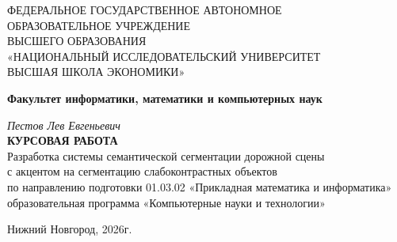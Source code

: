 \documentclass[14pt,a4paper]{extarticle}
\begin{document}
\onehalfspacing
\pagestyle{plain}
\sloppy
\begin{titlepage}
\thispagestyle{empty}
\begin{center}
\normalsize
ФЕДЕРАЛЬНОЕ ГОСУДАРСТВЕННОЕ АВТОНОМНОЕ\\
ОБРАЗОВАТЕЛЬНОЕ УЧРЕЖДЕНИЕ\\
ВЫСШЕГО ОБРАЗОВАНИЯ\\
«НАЦИОНАЛЬНЫЙ ИССЛЕДОВАТЕЛЬСКИЙ УНИВЕРСИТЕТ\\
ВЫСШАЯ ШКОЛА ЭКОНОМИКИ»

\vspace{4mm}

\textbf{Факультет информатики, математики и компьютерных наук}

\vfill

\textit{Пестов Лев Евгеньевич}\\[4mm]

\textbf{КУРСОВАЯ РАБОТА}\\[6mm]

Разработка системы семантической сегментации дорожной сцены\\
с акцентом на сегментацию слабоконтрастных объектов\\[5mm]

\normalsize{по направлению подготовки 01.03.02 «Прикладная математика и информатика»\\
образовательная программа «Компьютерные науки и технологии»}

\end{center}

\vfill
\hfill
\begin{minipage}{0.5\textwidth}
\end{minipage}
\vfill
\begin{center}
Нижний Новгород, 2026г.
\end{center}
\end{titlepage}
\setcounter{page}{2}
\newpage

\renewcommand{\contentsname}{Оглавление}
\tableofcontents
\newpage
\end{document}
